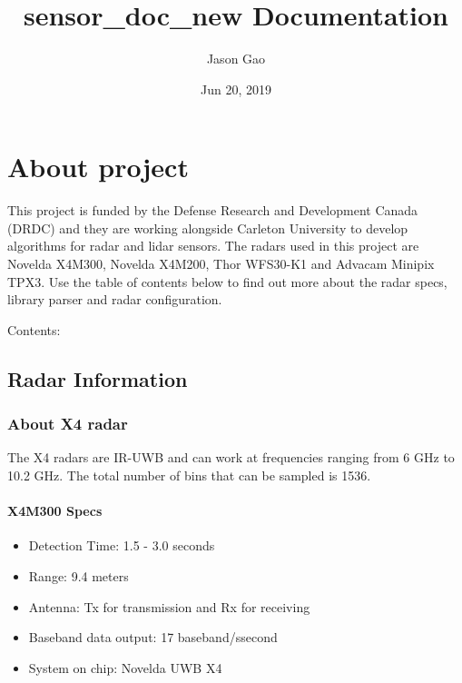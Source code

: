 \documentclass[letterpaper,10pt,english]{sphinxmanual}
\title{sensor\_doc\_new Documentation}
\date{Jun 20, 2019}
\author{Jason Gao}
\begin{document}
\maketitle
\tableofcontents
{}\label{\detokenize{index::doc}}



\chapter{About project}
\label{\detokenize{index:welcome-to-the-cudrdc-project-documentation}}\label{\detokenize{index:about-project}}
This project is funded by the Defense Research and Development Canada (DRDC) and they are working alongside Carleton University to develop algorithms for radar and lidar sensors. The radars used in this project are Novelda X4M300,
Novelda X4M200, Thor WFS30-K1 and Advacam Minipix TPX3. Use the table of contents below to find out more about the radar specs, library parser and radar configuration.

Contents:


\section{Radar Information}
\label{\detokenize{radar information:radar-information}}\label{\detokenize{radar information::doc}}

\subsection{About X4 radar}
\label{\detokenize{radar information:about-x4-radar}}
The X4 radars are IR-UWB and can work at frequencies ranging from 6 GHz to 10.2 GHz. The total number of bins that can be sampled is 1536.


\subsubsection{X4M300 Specs}
\label{\detokenize{radar information:x4m300-specs}}\begin{itemize}
\item {} 
Detection Time: 1.5 - 3.0 seconds

\item {} 
Range: 9.4 meters

\item {} 
Antenna: Tx for transmission and Rx for receiving

\item {} 
Baseband data output: 17 baseband/ssecond

\item {} 
System on chip: Novelda UWB X4

\end{itemize}
\end{document}
